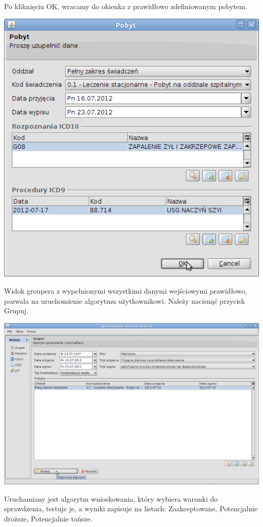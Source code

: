 Po kliknięciu OK, wracamy do okienka z prawidłowo zdefiniowanym pobytem.

\includegraphics[scale=0.4]{images/gruper7}

Widok groupera z wypełnionymi wszystkimi danymi wejściowymi prawidłowo, pozwala na uruchomienie algorytmu użytkownikowi. Należy nacisnąć przycisk Grupuj.

\includegraphics[scale=0.4]{images/gruper8}

Uruchamiany jest algorytm wnioskowania, który wybiera warunki do sprawdzenia, testuje je, a wyniki zapisuje na listach: Zaakceptowane, Potencjalnie droższe, Potencjalnie tańsze.

